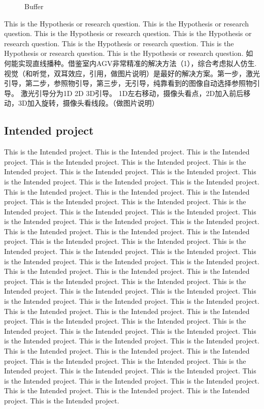 \documentclass[12pt]{article}
\begin{document}
\begin{flushleft}
\begin{figure}[h!]
\begin{center}
		\caption{Buffer}
	\end{center}
\end{figure}
This is the Hypothesis or research question. This is the Hypothesis or research question. This is the Hypothesis or research question. This is the Hypothesis or research question. This is the Hypothesis or research question. This is the Hypothesis or research question. This is the Hypothesis or research question.\cite{bozer1991tandem} 
如何能实现直线播种。借鉴室内AGV非常精准的解决方法（1），综合考虑拟人仿生.视觉（和听觉，双耳效应，引用，做图片说明）是最好的解决方案。第一步，激光引导，第二步，参照物引导，第三步，无引导，纯靠看到的图像自动选择参照物引导。
激光引导分为1D 2D 3D引导。 1D左右移动，摄像头看点，2D加入前后移动，3D加入旋转，摄像头看线段。（做图片说明）

\subsection{Intended project}
This is the Intended project. This is the Intended project. This is the Intended project. This is the Intended project. This is the Intended project. This is the Intended project. This is the Intended project. This is the Intended project. This is the Intended project. This is the Intended project. This is the Intended project. This is the Intended project. This is the Intended project. This is the Intended project. This is the Intended project. This is the Intended project. This is the Intended project. This is the Intended project. This is the Intended project. This is the Intended project. This is the Intended project. This is the Intended project. This is the Intended project. This is the Intended project. This is the Intended project. This is the Intended project. This is the Intended project. This is the Intended project. This is the Intended project. This is the Intended project. This is the Intended project. This is the Intended project. This is the Intended project. This is the Intended project. This is the Intended project. This is the Intended project. This is the Intended project. This is the Intended project. This is the Intended project. This is the Intended project. This is the Intended project. This is the Intended project. This is the Intended project. This is the Intended project. This is the Intended project. This is the Intended project. This is the Intended project. This is the Intended project. This is the Intended project. This is the Intended project. This is the Intended project. This is the Intended project. This is the Intended project. This is the Intended project. This is the Intended project. This is the Intended project. This is the Intended project. This is the Intended project. This is the Intended project. This is the Intended project. This is the Intended project. This is the Intended project. This is the Intended project. This is the Intended project. This is the Intended project. This is the Intended project. This is the Intended project. This is the Intended project. This is the Intended project. This is the Intended project. 

\end{flushleft}
\end{document}
